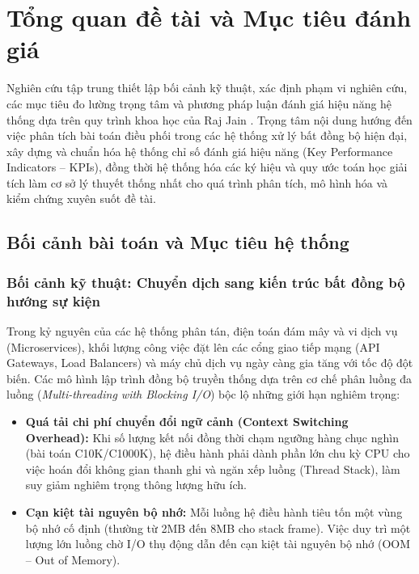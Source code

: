 \section{Tổng quan đề tài và Mục tiêu đánh giá}
\label{sec:tong-quan}

\hspace{0.5cm}Nghiên cứu tập trung thiết lập bối cảnh kỹ thuật, xác định phạm vi nghiên cứu, các mục tiêu đo lường trọng tâm và phương pháp luận đánh giá hiệu năng hệ thống dựa trên quy trình khoa học của Raj Jain \cite{ref_jain}. Trọng tâm nội dung hướng đến việc phân tích bài toán điều phối trong các hệ thống xử lý bất đồng bộ hiện đại, xây dựng và chuẩn hóa hệ thống chỉ số đánh giá hiệu năng (Key Performance Indicators -- KPIs), đồng thời hệ thống hóa các ký hiệu và quy ước toán học giải tích làm cơ sở lý thuyết thống nhất cho quá trình phân tích, mô hình hóa và kiểm chứng xuyên suốt đề tài.
\subsection{Bối cảnh bài toán và Mục tiêu hệ thống}
\label{subsec:boi-canh-muc-tieu}

\subsubsection{Bối cảnh kỹ thuật: Chuyển dịch sang kiến trúc bất đồng bộ hướng sự kiện}

\hspace{0.5cm}Trong kỷ nguyên của các hệ thống phân tán, điện toán đám mây và vi dịch vụ (Microservices), khối lượng công việc đặt lên các cổng giao tiếp mạng (API Gateways, Load Balancers) và máy chủ dịch vụ ngày càng gia tăng với tốc độ đột biến. Các mô hình lập trình đồng bộ truyền thống dựa trên cơ chế phân luồng đa luồng (\textit{Multi-threading with Blocking I/O}) bộc lộ những giới hạn nghiêm trọng:
\begin{itemize}[leftmargin=1.5em]
    \item \textbf{Quá tải chi phí chuyển đổi ngữ cảnh (Context Switching Overhead):} Khi số lượng kết nối đồng thời chạm ngưỡng hàng chục nghìn (bài toán C10K/C1000K), hệ điều hành phải dành phần lớn chu kỳ CPU cho việc hoán đổi không gian thanh ghi và ngăn xếp luồng (Thread Stack), làm suy giảm nghiêm trọng thông lượng hữu ích.
    \item \textbf{Cạn kiệt tài nguyên bộ nhớ:} Mỗi luồng hệ điều hành tiêu tốn một vùng bộ nhớ cố định (thường từ 2MB đến 8MB cho stack frame). Việc duy trì một lượng lớn luồng chờ I/O thụ động dẫn đến cạn kiệt tài nguyên bộ nhớ (OOM -- Out of Memory).
\end{itemize}

